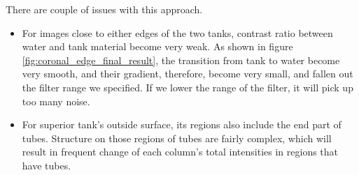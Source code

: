 There are couple of issues with this approach.
\begin{itemize}
  \item For images close to either edges of the two tanks, contrast ratio between water and tank material 
    become very weak. As shown in figure \ref{fig:coronal_edge_final_result}, the transition from tank to
    water become very smooth, and their gradient, therefore, become very small, and fallen out the filter
    range we specified. If we lower the range of the filter, it will pick up too many noise.
  \item For superior tank's outside surface, its regions also include the end part of tubes. Structure
    on those regions of tubes are fairly complex, which will result in frequent change of each column's 
    total intensities in regions that have tubes.
\end{itemize}

